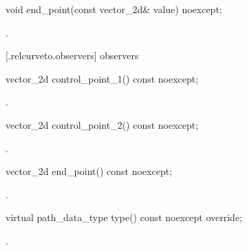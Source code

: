 \begin{itemdecl}
    void end_point(const vector_2d& value) noexcept;
\end{itemdecl}
\begin{itemdescr}
	\pnum
	\postconditions
	.
	
\end{itemdescr}

 [\iotwod.relcurveto.observers]{ observers}

\begin{itemdecl}
    vector_2d control_point_1() const noexcept;
\end{itemdecl}
\begin{itemdescr}
	\pnum
	\returns
	.

\end{itemdescr}

\begin{itemdecl}
    vector_2d control_point_2() const noexcept;
\end{itemdecl}
\begin{itemdescr}
	\pnum
	\returns
	.

\end{itemdescr}

\begin{itemdecl}
    vector_2d end_point() const noexcept;
\end{itemdecl}
\begin{itemdescr}
	\pnum
	\returns
	.

\end{itemdescr}

\begin{itemdecl}
    virtual path_data_type type() const noexcept override;
\end{itemdecl}
\begin{itemdescr}
	\pnum
	\returns
	.

\end{itemdescr}

